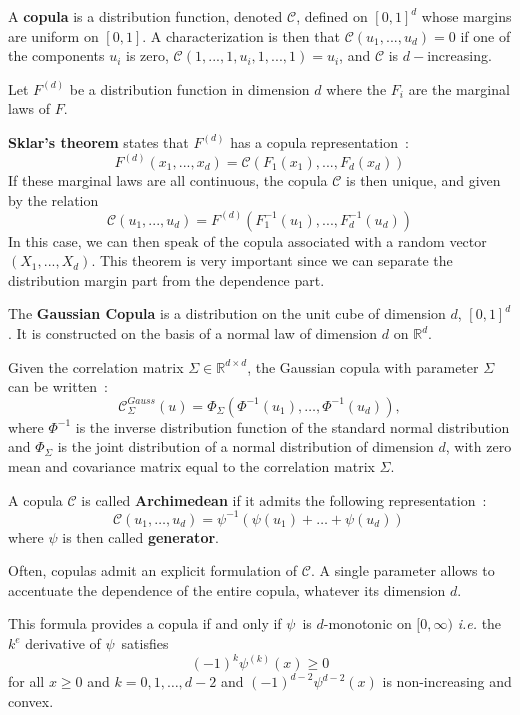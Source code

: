 \begin{f}[Copula]
A \textbf{copula} is a distribution function, denoted $\mathcal{C}$, defined on $[0,1]^d$ whose margins are uniform on $[0,1]$. 
A characterization is then that $\mathcal{C}(u_1,...,u_d)=0$ if one of the components $u_i$ is zero, $\mathcal{C}(1,...,1,u_i,1,...,1)=u_i$, and $\mathcal{C}$ is $d-$increasing.
\medskip
		
Let $F^{(d)}$ be a distribution function in dimension $d$ where the $F_i$ are the marginal laws of $F$. 

\textbf{Sklar's theorem} states that $F^{(d)}$ has a copula representation~:
$$
F^{(d)} (x_1,...,x_d) = \mathcal{C} (F_1(x_1),...,F_d(x_d))
$$
If these marginal laws are all continuous, the copula $\mathcal{C}$ is then unique, and given by the relation 
$$
\mathcal{C}(u_1,...,u_d)=F^{(d)}(F_1^{-1} (u_1),...,F_d^{-1} (u_d))
$$
In this case, we can then speak of the copula associated with a random vector $(X_1,...,X_d)$.
This theorem is very important since we can separate the distribution margin part from the dependence part.
\medskip
	
The \textbf{Gaussian Copula} is a distribution on the unit cube of dimension $d$, $[0,1]^d$.
It is constructed on the basis of a normal law of dimension $d$ on $\mathbb{R}^d$.

Given the correlation matrix $\Sigma\in\mathbb{R}^{d\times d}$, the Gaussian copula with parameter $\Sigma$ can be written~:
$$
\mathcal{C}_\Sigma^{Gauss}(u) = \Phi_\Sigma\left(\Phi^{-1}(u_1),\dots, \Phi^{-1}(u_d) \right), 
$$
where $\Phi^{-1}$ is the inverse distribution function of the standard normal distribution and $\Phi_\Sigma$ is the joint distribution of a normal distribution of dimension $d$, with zero mean and covariance matrix equal to the correlation matrix $\Sigma$.
\medskip	

	A copula $\mathcal{C}$ is called \textbf{Archimedean} if it admits the following representation~:
$$
\mathcal{C}(u_1,\dots,u_d) = \psi^{-1}\left(\psi(u_1)+\dots+\psi(u_d)\right)\,
$$
where $\psi$ is then called \textbf{generator}.

Often, copulas admit an explicit formulation of $\mathcal{C}$. 
A single parameter allows to accentuate the dependence of the entire copula, whatever its dimension $d$.


This formula provides a copula if and only if $\psi\,$ is $d$-monotonic on $[0,\infty)$ \emph{i.e.} the $k^e$ derivative of $\psi\,$ satisfies
$$
(-1)^k\psi^{(k)}(x) \geq 0
$$
for all $x\geq 0$ and $k=0,1,\dots,d-2$ and $(-1)^{d-2}\psi^{d-2}(x)$ is non-increasing and convex.
\medskip


\end{f}
